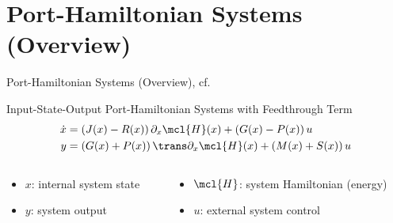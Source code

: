 \section{Port-Hamiltonian Systems (Overview)}

\begin{frame}{Port-Hamiltonian Systems (Overview), cf.~\cite{VanDerSchaft2014}}
    \begin{block}{Input-State-Output Port-Hamiltonian Systems with Feedthrough Term}
        \begin{align*}
            \dot{x} &= \left( J(x) - R(x) \right) \partial_x \mcl{H}(x) + \left( G(x) - P(x) \right) u \\
            y &= \left( G(x) + P(x) \right)\trans \partial_x \mcl{H}(x) + \left( M(x) + S(x) \right) u
        \end{align*}
    \end{block}

    \begin{columns}
        \begin{column}{.41\textwidth}
            \begin{itemize}
                \item $x$: internal system state
                \item $y$: system output
            \end{itemize}
        \end{column}
        \begin{column}{.41\textwidth}
            \begin{itemize}
                \item $\mcl{H}$: system Hamiltonian (energy)
                \item $u$: external system control
            \end{itemize}
        \end{column}
    \end{columns}


\end{frame}
